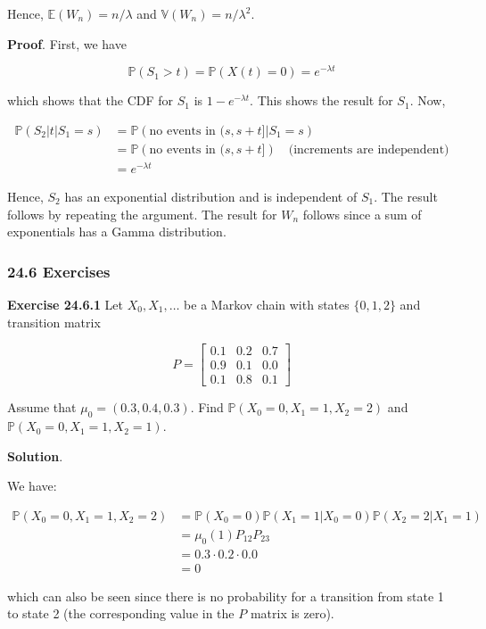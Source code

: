 Hence, \(\mathbb{E}(W_n) = n / \lambda\) and
\(\mathbb{V}(W_n) = n / \lambda^2\).

\textbf{Proof}. First, we have

\[ \mathbb{P}(S_1 > t) = \mathbb{P}(X(t) = 0) = e^{-\lambda t}\]

which shows that the CDF for \(S_1\) is \(1 - e^{-\lambda t}\). This
shows the result for \(S_1\). Now,

\[
\begin{align}
\mathbb{P}(S_2 | t | S_1 = s) &= \mathbb{P}\left(\text{no events in } (s, s+t] | S_1 = s\right) \\
&= \mathbb{P}\left(\text{no events in } (s, s+t]\right) \quad \text{(increments are independent)} \\
&= e^{-\lambda t}
\end{align}
\]

Hence, \(S_2\) has an exponential distribution and is independent of
\(S_1\). The result follows by repeating the argument. The result for
\(W_n\) follows since a sum of exponentials has a Gamma distribution.

\subsubsection{24.6 Exercises}\label{exercises}

\textbf{Exercise 24.6.1} Let \(X_0, X_1, \dots\) be a Markov chain with
states \(\{ 0, 1, 2 \}\) and transition matrix

\[ P = \begin{bmatrix}
0.1 & 0.2 & 0.7 \\
0.9 & 0.1 & 0.0 \\
0.1 & 0.8 & 0.1
\end{bmatrix}\]

Assume that \(\mu_0 = (0.3, 0.4, 0.3)\). Find
\(\mathbb{P}(X_0 = 0, X_1 = 1, X_2 = 2)\) and
\(\mathbb{P}(X_0 = 0, X_1 = 1, X_2 = 1)\).

\textbf{Solution}.

We have:

\[
\begin{align}
\mathbb{P}(X_0 = 0, X_1 = 1, X_2 = 2) &= \mathbb{P}(X_0 = 0) \mathbb{P}(X_1 = 1 | X_0 = 0) \mathbb{P}(X_2 = 2 | X_1 = 1) \\
&= \mu_0(1) P_{12} P_{23} \\
& = 0.3 \cdot 0.2 \cdot 0.0 \\
& = 0
\end{align}
\]

which can also be seen since there is no probability for a transition
from state 1 to state 2 (the corresponding value in the \(P\) matrix is
zero).


